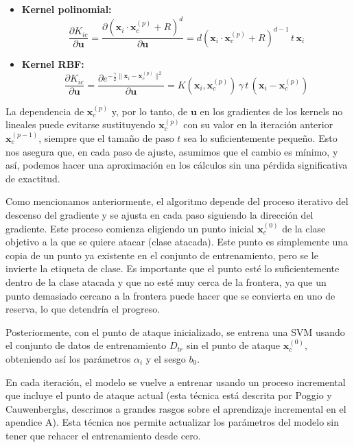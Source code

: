 \documentclass[letterpaper,12pt,oneside]{book}
\begin{document}
{{{{\begin{itemize}
    \item \textbf{Kernel polinomial:}
    \[
    \frac{\partial K_{ic}}{\partial \mathbf{u}} = \frac{\partial (\mathbf{x}_i \cdot \mathbf{x}_c^{(p)} + R)^d}{\partial \mathbf{u}} = d (\mathbf{x}_i \cdot \mathbf{x}_c^{(p)} + R)^{d-1}\, t\, \mathbf{x}_i
    \]

    \item \textbf{Kernel RBF:}
    \[
    \frac{\partial K_{ic}}{\partial \mathbf{u}} = \frac{\partial e^{-\frac{\gamma}{2} \| \mathbf{x}_i - \mathbf{x}_c^{(p)} \|^2}}{\partial \mathbf{u}} = K(\mathbf{x}_i, \mathbf{x}_c^{(p)})\, \gamma\, t\, (\mathbf{x}_i - \mathbf{x}_c^{(p)})
    \]
\end{itemize}

La dependencia de \( \mathbf{x}_c^{(p)}\) y, por lo tanto, de \( \mathbf{u}\) en los gradientes de los kernels no lineales puede evitarse sustituyendo \( \mathbf{x}_c^{(p)}\) con su valor en la iteración anterior \( \mathbf{x}_c^{(p-1)}\), siempre que el tamaño de paso \(t\) sea lo suficientemente pequeño. Esto nos asegura que, en cada paso de ajuste, asumimos que el cambio es mínimo, y así, podemos hacer una aproximación en los cálculos sin una pérdida significativa de exactitud.

Como mencionamos anteriormente, el algoritmo depende del proceso iterativo del descenso del gradiente y se ajusta en cada paso siguiendo la dirección del gradiente. Este proceso comienza eligiendo un punto inicial \( \mathbf{x}_c^{(0)}\) de la clase objetivo a la que se quiere atacar (clase atacada). Este punto es simplemente una copia de un punto ya existente en el conjunto de entrenamiento, pero se le invierte la etiqueta de clase. Es importante que el punto esté lo suficientemente dentro de la clase atacada y que no esté muy cerca de la frontera, ya que un punto demasiado cercano a la frontera puede hacer que se convierta en uno de reserva, lo que detendría el progreso.

Posteriormente, con el punto de ataque inicializado, se entrena una SVM usando el conjunto de datos de entrenamiento \(D_{tr}\) sin el punto de ataque \( \mathbf{x}_c^{(0)}\), obteniendo así los parámetros \(\alpha_i\) y el sesgo \(b_0\).

En cada iteración, el modelo se vuelve a entrenar usando un proceso incremental que incluye el punto de ataque actual (esta técnica está descrita por Poggio y Cauwenberghs, descrimos a grandes rasgos sobre el aprendizaje incremental en el apendice A). Esta técnica nos permite actualizar los parámetros del modelo sin tener que rehacer el entrenamiento desde cero.

}}}}
\end{document}
